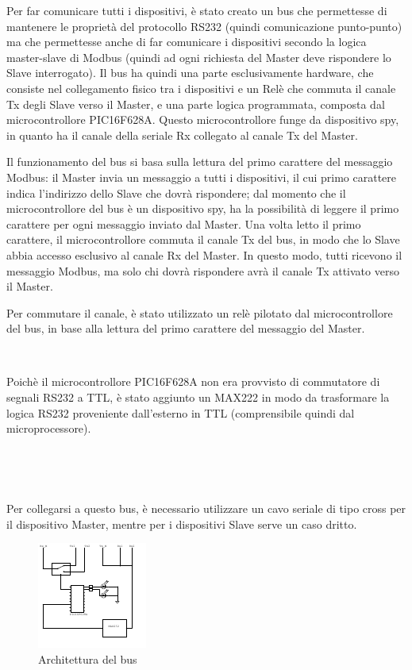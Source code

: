 \documentclass[a4paper,titlepage]{book}
\begin{document}
Per far comunicare tutti i dispositivi, è stato creato un bus che permettesse di mantenere le proprietà del protocollo RS232 (quindi comunicazione punto-punto) ma che permettesse anche di far comunicare i dispositivi secondo la logica master-slave di Modbus (quindi ad ogni richiesta del Master deve rispondere lo Slave interrogato). Il bus ha quindi una parte esclusivamente hardware, che consiste nel collegamento fisico tra i dispositivi e un Relè che commuta il canale Tx degli Slave verso il Master, e una parte logica programmata, composta dal microcontrollore PIC16F628A. Questo microcontrollore funge da dispositivo spy, in quanto ha il canale della seriale Rx collegato al canale Tx del Master.

Il funzionamento del bus si basa sulla lettura del primo carattere del messaggio Modbus: il Master invia un messaggio a tutti i dispositivi, il cui primo carattere indica l'indirizzo dello Slave che dovrà rispondere; dal momento che il microcontrollore del bus è un dispositivo spy, ha la possibilità di leggere il primo carattere per ogni messaggio inviato dal Master. Una volta letto il primo carattere, il microcontrollore commuta il canale Tx del bus, in modo che lo Slave abbia accesso esclusivo al canale Rx del Master. In questo modo, tutti ricevono il messaggio Modbus, ma solo chi dovrà rispondere avrà il canale Tx attivato verso il Master.

Per commutare il canale, è stato utilizzato un relè pilotato dal microcontrollore del bus, in base alla lettura del primo carattere del messaggio del Master.

~

Poichè il microcontrollore PIC16F628A non era provvisto di commutatore di segnali RS232 a TTL, è stato aggiunto un MAX222 in modo da trasformare la logica RS232 proveniente dall'esterno in TTL (comprensibile quindi dal microprocessore).

~

~

Per collegarsi a questo bus, è necessario utilizzare un cavo seriale di tipo cross per il dispositivo Master, mentre per i dispositivi Slave serve un caso dritto.


\begin{figure}[!h]
\centering
\includegraphics[scale=4.5]{bus.pdf}
\caption{Architettura del bus}\label{fig:1}
\end{figure}
\end{document}
